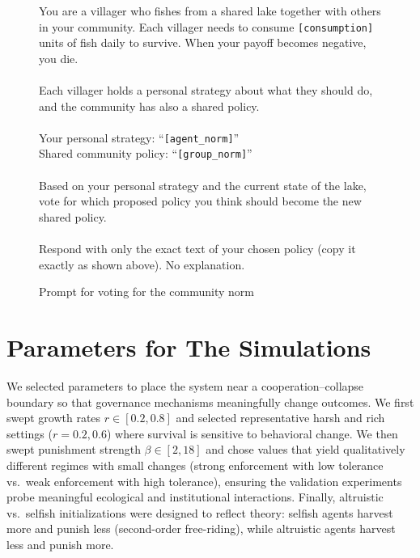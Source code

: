 \documentclass[sigconf]{aamas}
\begin{document}
\begin{appendix}
\begin{figure}[h!]
\centering
\begin{mdframed}[linewidth=1pt, linecolor=gray!50, backgroundcolor=gray!5]
\footnotesize
You are a villager who fishes from a shared lake together with others in your community.
Each villager needs to consume \texttt{[consumption]} units of fish daily to survive. When your payoff becomes negative, you die. \\
\\
Each villager holds a personal strategy about what they should do, and the community has also a shared policy. \\
\\
Your personal strategy: ``\texttt{[agent\_norm]}'' \\
Shared community policy: ``\texttt{[group\_norm]}'' \\
\\
Based on your personal strategy and the current state of the lake, vote for which proposed policy you think should become the new shared policy. \\
\\
Respond with only the exact text of your chosen policy (copy it exactly as shown above). No explanation.
\end{mdframed}
\caption{Prompt for voting for the community norm}
\label{fig:prompt_vote}
\end{figure}

\section{Parameters for The Simulations}
We selected parameters to place the system near a cooperation--collapse boundary so that governance mechanisms meaningfully change outcomes.
We first swept growth rates $r\in[0.2,0.8]$ and selected representative harsh and rich settings ($r=0.2, 0.6$) where survival is sensitive to behavioral change.
We then swept punishment strength $\beta\in[2,18]$ and chose values that yield qualitatively different regimes with small changes (strong enforcement with low tolerance vs.\ weak enforcement with high tolerance), ensuring the validation experiments probe meaningful ecological and institutional interactions.
Finally, altruistic vs.\ selfish initializations were designed to reflect theory: selfish agents harvest more and punish less (second-order free-riding), while altruistic agents harvest less and punish more.


\end{appendix}
\end{document}
